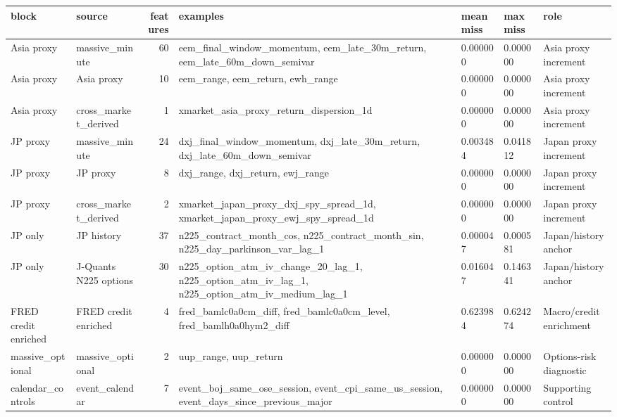 \begin{tabular}{llrllll}
\toprule
block & source & features & examples & mean miss & max miss & role \\
\midrule
Asia proxy & massive\_minute & 60 & eem\_final\_window\_momentum, eem\_late\_30m\_return, eem\_late\_60m\_down\_semivar & 0.000000 & 0.000000 & Asia proxy increment \\
Asia proxy & Asia proxy & 10 & eem\_range, eem\_return, ewh\_range & 0.000000 & 0.000000 & Asia proxy increment \\
Asia proxy & cross\_market\_derived & 1 & xmarket\_asia\_proxy\_return\_dispersion\_1d & 0.000000 & 0.000000 & Asia proxy increment \\
JP proxy & massive\_minute & 24 & dxj\_final\_window\_momentum, dxj\_late\_30m\_return, dxj\_late\_60m\_down\_semivar & 0.003484 & 0.041812 & Japan proxy increment \\
JP proxy & JP proxy & 8 & dxj\_range, dxj\_return, ewj\_range & 0.000000 & 0.000000 & Japan proxy increment \\
JP proxy & cross\_market\_derived & 2 & xmarket\_japan\_proxy\_dxj\_spy\_spread\_1d, xmarket\_japan\_proxy\_ewj\_spy\_spread\_1d & 0.000000 & 0.000000 & Japan proxy increment \\
JP only & JP history & 37 & n225\_contract\_month\_cos, n225\_contract\_month\_sin, n225\_day\_parkinson\_var\_lag\_1 & 0.000047 & 0.000581 & Japan/history anchor \\
JP only & J-Quants N225 options & 30 & n225\_option\_atm\_iv\_change\_20\_lag\_1, n225\_option\_atm\_iv\_lag\_1, n225\_option\_atm\_iv\_medium\_lag\_1 & 0.016047 & 0.146341 & Japan/history anchor \\
FRED credit enriched & FRED credit enriched & 4 & fred\_bamlc0a0cm\_diff, fred\_bamlc0a0cm\_level, fred\_bamlh0a0hym2\_diff & 0.623984 & 0.624274 & Macro/credit enrichment \\
massive\_optional & massive\_optional & 2 & uup\_range, uup\_return & 0.000000 & 0.000000 & Options-risk diagnostic \\
calendar\_controls & event\_calendar & 7 & event\_boj\_same\_ose\_session, event\_cpi\_same\_us\_session, event\_days\_since\_previous\_major & 0.000000 & 0.000000 & Supporting control \\

\end{tabular}
